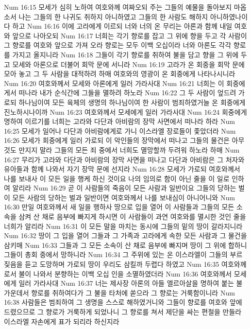 Num 16:15  모세가 심히 노하여 여호와께 여짜오되 주는 그들의 예물을 돌아보지 마옵소서 나는 그들의 한 나귀도 취하지 아니하였고 그들의 한 사람도 해하지 아니하였나이다 하고
Num 16:16  이에 고라에게 이르되 너와 너의 온 무리는 아론과 함께 내일 여호와 앞으로 나아오되
Num 16:17  너희는 각기 향로를 잡고 그 위에 향을 두고 각 사람이 그 향로를 여호와 앞으로 가져 오라 향로는 모두 이백 오십이라 너와 아론도 각각 향로를 가지고 올지니라
Num 16:18  그들이 각기 향로를 취하여 불을 담고 향을 그 위에 두고 모세와 아론으로 더불어 회막 문에 서니라
Num 16:19  고라가 온 회중을 회막 문에 모아 놓고 그 두 사람을 대적하려 하매 여호와의 영광이 온 회중에게 나타나시니라
Num 16:20  여호와께서 모세와 아론에게 일러 가라사대
Num 16:21  너희는 이 회중에게서 떠나라 내가 순식간에 그들을 멸하려 하노라
Num 16:22  그 두 사람이 엎드려 가로되 하나님이여 모든 육체의 생명의 하나님이여 한 사람이 범죄하였거늘 온 회중에게 진노하시나이까
Num 16:23  여호와께서 모세에게 일러 가라사대
Num 16:24  회중에게 명하여 이르기를 너희는 고라와 다단과 아비람의 장막 사면에서 떠나라 하라
Num 16:25  모세가 일어나 다단과 아비람에게로 가니 이스라엘 장로들이 좇았더라
Num 16:26  모세가 회중에게 일러 가로되 이 악인들의 장막에서 떠나고 그들의 물건은 아무것도 만지지 말라 그들의 모든 죄 중에서 너희도 멸망할까 두려워 하노라 하매
Num 16:27  무리가 고라와 다단과 아비람의 장막 사면을 떠나고 다단과 아비람은 그 처자와 유아들과 함께 나와서 자기 장막 문에 선지라
Num 16:28  모세가 가로되 여호와께서 나를 보내사 이 모든 일을 행케 하신 것이요 나의 임의로 함이 아닌 줄을 이 일로 인하여 알리라
Num 16:29  곧 이 사람들의 죽음이 모든 사람과 일반이요 그들의 당하는 벌이 모든 사람의 당하는 벌과 일반이면 여호와께서 나를 보내심이 아니어니와
Num 16:30  만일 여호와께서 새 일을 행하사 땅으로 입을 열어 이 사람들과 그들의 모든 소속을 삼켜 산 채로 음부에 빠지게 하시면 이 사람들이 과연 여호와를 멸시한 것인 줄을 너희가 알리라
Num 16:31  이 모든 말을 마치는 동시에 그들의 밑의 땅이 갈라지니라
Num 16:32  땅이 그 입을 열어 그들과 그 가족과 고라에게 속한 모든 사람과 그 물건을 삼키매
Num 16:33  그들과 그 모든 소속이 산 채로 음부에 빠지며 땅이 그 위에 합하니 그들이 총회 중에서 망하니라
Num 16:34  그 주위에 있는 온 이스라엘이 그들의 부르짖음을 듣고 도망하며 가로되 땅이 우리도 삼킬까 두렵다 하였고
Num 16:35  여호와께로서 불이 나와서 분향하는 이백 오십 인을 소멸하였더라
Num 16:36  여호와께서 모세에게 일러 가라사대
Num 16:37  너는 제사장 아론의 아들 엘르아살을 명하여 붙는 불 가운데서 향로를 취하여다가 그 불을 타처에 쏟으라 그 향로는 거룩함이니라
Num 16:38  사람들은 범죄하여 그 생명을 스스로 해하였거니와 그들이 향로를 여호와 앞에 드렸으므로 그 향로가 거룩하게 되었나니 그 향로를 쳐서 제단을 싸는 편철을 만들라 이스라엘 자손에게 표가 되리라 하신지라
